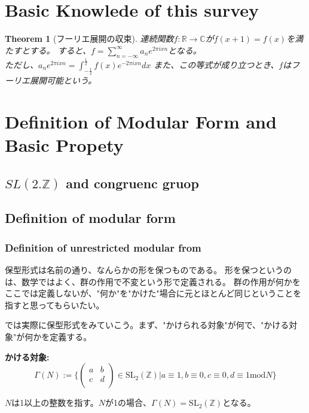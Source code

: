 \documentclass{ujarticle}
\newtheorem{thm}{Theorem}[section]
\begin{document}
\section{Basic Knowlede of this survey}
\label{sec:Basic Knowlede of this survey}

\begin{thm}[フーリエ展開の収束]
\label{thm:fourier}
 連続関数$f:\mathbb{R} \to \mathbb{C}$が$f(x + 1) = f(x)$を満たすとする。
 すると、$f= \displaystyle  \sum_{n= - \infty }^{\infty}a_ne^{2 \pi i x n}$となる。\\
 ただし、$a_n e^{2 \pi i x n}= \int_{-\frac{1}{2}}^{\frac{1}{2}}f(x)e^{-2 \pi i x n}dx$
また、この等式が成り立つとき、$f$はフーリエ展開可能という。
\end{thm}

\section{Definition of Modular Form and Basic Propety}
\label{sec:Modular Form}

\subsection{$SL(2.\mathbb{Z})$ and congruenc gruop}
\label{sub:$SL(2.Z and congurenc gruop}


\subsection{Definition of modular form}
\label{sub:Definition of modular form}
\subsubsection{Definition of unrestricted modular from}
\label{subs:Definition of unrestricted modular from}

保型形式は名前の通り、なんらかの形を保つものである。
形を保つというのは、数学ではよく、群の作用で不変という形で定義される。
群の作用が何かをここでは定義しないが、"何か"を"かけた"場合に元とほとんど同じということを指すと思ってもらいたい。

\noindent では実際に保型形式をみていこう。まず、"かけられる対象"が何で、"かける対象"が何かを定義する。

\noindent \bf{かける対象:}
\begin{equation*}
  \Gamma(N) := \{
  \begin{pmatrix}
    a & b \\
    c & d \\
  \end{pmatrix}
  \in \mathrm{SL}_2(\mathbb{Z}) | a \equiv 1,b \equiv 0,c \equiv 0, d \equiv 1 \mathrm{mod} N
  \}
\end{equation*}
\begin{center}
  $N$は1以上の整数を指す。$N$が1の場合、$\Gamma(N) = \mathrm{SL_2(\mathbb{Z})}$となる。
\end{center}
\end{document}
